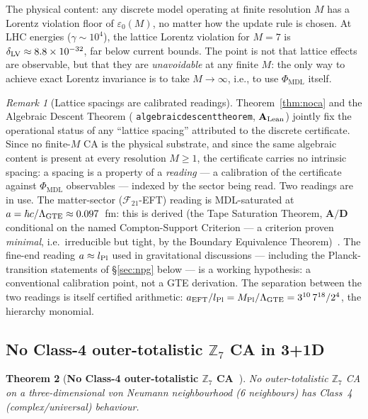 \documentclass[11pt]{article}
\newtheorem{theorem}{Theorem}[section]
\theoremstyle{remark}
\newtheorem{remark}[theorem]{Remark}
\newcommand{\PHIMDL}{\Phi_{\mathrm{MDL}}}
\newcommand{\ZS}{\mathbb{Z}_7}
\newcommand{\lean}[1]{%
  \penalty-100
  \begingroup\def\_{\textunderscore\allowbreak}\texttt{#1}\endgroup}
\newcommand{\epsz}{\varepsilon_0}
\newcommand{\FTT}{\mathcal{F}_{21}}
\newcommand{\CatAL}{\ensuremath{\textbf{A}_{\rm Lean}}}
\newcommand{\CatAD}{\textbf{A/D}}
\begin{document}
The physical content: any discrete model operating at finite resolution $M$
has a Lorentz violation floor of $\epsz(M)$, no matter how the update rule is
chosen.  At LHC energies ($\gamma\sim 10^4$), the lattice Lorentz violation
for $M=7$ is $\delta_{\rm LV} \approx 8.8\times10^{-32}$, far below current
bounds.  The point is not that lattice effects are observable, but that
they are \emph{unavoidable} at any finite $M$: the only way to achieve exact
Lorentz invariance is to take $M\to\infty$, i.e., to use $\PHIMDL$ itself.

\begin{remark}[Lattice spacings are calibrated readings]
\label{rem:calibrated_reading}
Theorem~\ref{thm:noca} and the Algebraic Descent Theorem
(\lean{algebraic\_descent\_theorem}, $\CatAL$) jointly fix the operational
status of any ``lattice spacing'' attributed to the discrete certificate.
Since no finite-$M$ CA is the physical substrate, and since the same algebraic
content is present at every resolution $M \geq 1$, the certificate carries no
intrinsic spacing: a spacing is a property of a \emph{reading} --- a
calibration of the certificate against $\PHIMDL$ observables --- indexed by
the sector being read.
Two readings are in use.
The matter-sector ($\FTT$-EFT) reading is MDL-saturated at
$a = \hbar c/\Lambda_{\rm GTE} \approx 0.097$~fm: this is derived (the Tape
Saturation Theorem, $\CatAD$ conditional on the named Compton-Support
Criterion --- a criterion proven \emph{minimal}, i.e.\ irreducible but tight,
by the Boundary Equivalence Theorem)~\cite{SpivackSpin7Lattice}.
The fine-end reading $a \approx l_{\rm Pl}$ used in gravitational
discussions --- including the Planck-transition statements of
\S\ref{sec:npg} below --- is a working hypothesis: a conventional calibration
point, not a GTE derivation.
The separation between the two readings is itself certified arithmetic:
$a_{\rm EFT}/l_{\rm Pl} = M_{\rm Pl}/\Lambda_{\rm GTE} = 3^{10}\,7^{18}/2^4$,
the hierarchy monomial.
\end{remark}

\subsection{No Class-4 outer-totalistic \texorpdfstring{$\ZS$}{Z7} CA in 3+1D}

\begin{theorem}[\textbf{No Class-4 outer-totalistic $\ZS$ CA~\cite{SpivackCMCA}}]
\label{thm:noclass4}
No outer-totalistic $\ZS$ CA on a three-dimensional von Neumann neighbourhood
(6 neighbours) has Class~4 (complex/universal) behaviour.
\end{theorem}
\end{document}
